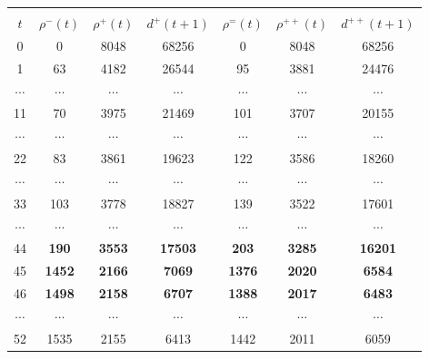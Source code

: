 \begin{multicols}{2}
\begin{table*}[b]
\begin{center}
\vspace*{2ex}

\begin{tabular}{|c||c|c|c||c|c|c|} 
\hline
&&&&&&\\[-9pt]
$t$  & $\rho^{-}(t)$ & $\rho^{+}(t)$ & $d^{+}(t+1)$ &
$\rho^{=}(t)$ & $\rho^{++}(t)$&  $d^{++}(t+1)$ \\ 
\hline
\hphantom{99}0  & \hphantom{99}0   & 8048&  68256&  \hphantom{9}0   &  8048&   68256\\
1  & \hphantom{9}63  & 4182&  26544&  \hphantom{9}95  &  3881&   24476\\
$\cdots$  & $\cdots$   & $\cdots$   &  $\cdots$    &  $\cdots$   &  $\cdots$   &   $\cdots$\\
11 & \hphantom{9}70  & 3975&  21469&  \hphantom{9}101\hphantom{9} &  3707&   20155\\
$\cdots$& $\cdots$   & $\cdots$   &  $\cdots$    & $\cdots$   &  $\cdots$   &  $\cdots$\\
22 & \hphantom{9}83  & 3861&  19623&  \hphantom{9}122\hphantom{9} &  3586&   18260\\
$\cdots$ & $\cdots$  & $\cdots$   &  $\cdots$   &  $\cdots$   &  $\cdots$  &   $\cdots$\\
33 & \hphantom{9}103\hphantom{9} & 3778&  18827&  \hphantom{9}139\hphantom{9} &  3522&   17601\\
$\cdots$ &$\cdots$  &$\cdots$  & $\cdots$  & $\cdots$   &  $\cdots$  &  $\cdots$\\
44 & \hphantom{9}\bf 190\hphantom{9} & \bf3553&  \bf17503&  \hphantom{9}\bf203\hphantom{9} &  \bf3285&   \bf16201\\
45 & \hphantom{9}\bf1452\hphantom{99}& \bf2166&  \hphantom{9}\bf7069 &  \hphantom{9}\bf1376\hphantom{99}&  \bf2020&   \hphantom{9}\bf6584\\
46 & \hphantom{9}\bf1498\hphantom{99}& \bf2158&  \hphantom{9}\bf6707 &  \hphantom{9}\bf1388\hphantom{99}&  \bf2017&   \hphantom{9}\bf6483\\
$\cdots$ & $\cdots$   & $\cdots$   &  $\cdots$    & $\cdots$   &  $\cdots$   &  $\cdots$\\
52 & \hphantom{9}1535\hphantom{99}& 2155&  \hphantom{9}6413 & \hphantom{9}1442\hphantom{99} &  2011&   \hphantom{9}6059\\
\hline
\end{tabular}
\end{center}
\begin{center}
\vspace*{2ex}



\end{center}
\end{table*}
\end{multicols}
